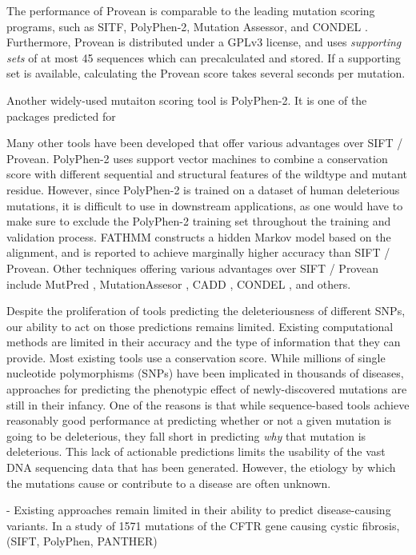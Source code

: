 The performance of Provean is comparable to the leading mutation scoring programs, such as SITF, PolyPhen-2, Mutation Assessor, and CONDEL \cite{choi_predicting_2012}. Furthermore, Provean is distributed under a GPLv3 license, and uses \textit{supporting sets} of at most 45 sequences which can precalculated and stored. If a supporting set is available, calculating the Provean score takes several seconds per mutation.

Another widely-used mutaiton scoring tool is PolyPhen-2. It is one of the packages predicted for

Many other tools have been developed that offer various advantages over SIFT / Provean. PolyPhen-2 \cite{adzhubei_predicting_2001} uses support vector machines to combine a conservation score with different sequential and structural features of the wildtype and mutant residue. However, since PolyPhen-2 is trained on a dataset of human deleterious mutations, it is difficult to use in downstream applications, as one would have to make sure to exclude the PolyPhen-2 training set throughout the training and validation process. FATHMM \cite{shihab_ranking_2014} constructs a hidden Markov model based on the alignment, and is reported to achieve marginally higher accuracy than SIFT / Provean. Other techniques offering various advantages over SIFT / Provean include MutPred \cite{li_automated_2009}, MutationAssesor \cite{network_integrated_2011}, CADD \cite{kircher_general_2014}, CONDEL \cite{choi_predicting_2012}, and others.

Despite the proliferation of tools predicting the deleteriousness of different SNPs, our ability to act on those predictions remains limited. Existing computational methods are limited in their accuracy and the type of information that they can provide. Most existing tools use a conservation score. While millions of single nucleotide polymorphisms (SNPs) have been implicated in thousands of diseases, approaches for predicting the phenotypic effect of newly-discovered mutations are still in their infancy. One of the reasons is that while sequence-based tools achieve reasonably good performance at predicting whether or not a given mutation is going to be deleterious, they fall short in predicting \textit{why} that mutation is deleterious. This lack of actionable predictions limits the usability of the vast DNA sequencing data that has been generated. However, the etiology by which the mutations cause or contribute to a disease are often unknown.

- Existing approaches remain limited in their ability to predict disease-causing variants. In a study of 1571 mutations of the CFTR gene causing cystic fibrosis, (SIFT, PolyPhen, PANTHER) \cite{dorfman_common_2010}


